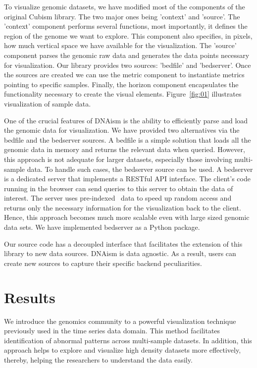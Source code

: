 \documentclass{bioinfo}
\begin{document}
To visualize genomic datasets, we have modified most of the components of the
original Cubism library.  The two major ones being 'context' and
'source'.  The 'context' component performs several functions, most
importantly, it defines the region of the genome we want to explore. This
component also specifies, in pixels, how much vertical space we have available
for the visualization.  The 'source' component parses the genomic raw data and
generates the data points necessary for visualization. Our library provides two
sources: 'bedfile' and 'bedserver'. Once the sources are created we can use the
metric component to instantiate metrics pointing to specific samples.  Finally,
the horizon component encapsulates the functionality necessary to create the
visual elements. Figure~\ref{fig:01} illustrates visualization of sample data.

One of the crucial features of DNAism is the ability to efficiently parse and
load the genomic data for visualization. We have provided two alternatives via
the bedfile and the bedserver sources. A bedfile is a simple solution that
loads all the genomic data in memory and returns the relevant data when
queried.  However, this approach is not adequate for larger datasets,
especially those involving multi-sample data. To handle such cases, the
bedserver source can be used. A bedserver is a dedicated server that
implements a RESTful API interface. The client's code running in the browser
can send queries to this server to obtain the data of interest.  The server
uses pre-indexed~\citep{tabix-li} data to speed up random access and returns
only the necessary information for the visualization back to the client.
Hence, this approach becomes much more scalable even with large sized genomic
data sets. We have implemented bedserver as a Python package.

Our source code has a decoupled interface that facilitates the extension of
this library to new data sources. DNAism is data agnostic. As a result, users
can create new sources to capture their specific backend peculiarities.


\section{Results}

We introduce the genomics community to a powerful visualization technique
previously used in the time series data domain. This method facilitates
identification of abnormal patterns across multi-sample datasets.  In addition, this
approach helps to explore and visualize high density datasets more effectively,
thereby, helping the researchers to understand the data easily.
\end{document}
